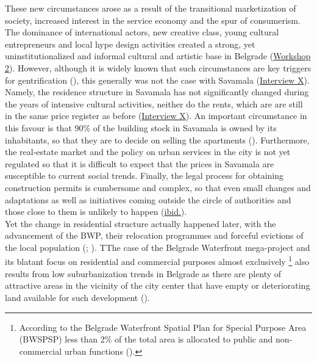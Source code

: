 \documentclass[11pt]{report}
\begin{document}
These new circumstances arose as a result of the transitional marketization of society, increased interest in the service economy and the spur of consumerism. The dominance of international actors, new creative class, young cultural entrepreneurs and local hype design activities created a strong, yet uninstitutionalized and informal cultural and artistic base in Belgrade (\href{PHD Workshop}{Workshop 2}).
However, although it is widely known that such circumstances are key triggers for gentrification  (\href{ref}{\citealt{krusche_gentrification_2015}}),
this generally was not the case with Savamala (\href{InterviewX}{Interview X}).
Namely, the residence structure in Savamala has not significantly changed during the years of intensive cultural activities, neither do the rents, which are are still in the same price register as before (\href{InterviewX}{Interview X}).
An important circumstance in this favour is that 90\% of the building stock in Savamala is owned by its inhabitants, so that they are to decide on selling the apartments (\href{ref}{\citealt{krusche_role_2015}}).
Furthermore, the real-estate market and the policy on urban services in the city is not yet regulated so that it is difficult to expect that the prices in Savamala are susceptible to current social trends.
Finally, the legal process for obtaining construction permits is cumbersome and complex, so that even small changes and adaptations as well as initiatives coming outside the circle of authorities and those close to them is unlikely to happen (\href{Klaus}{ibid.}).
\\

Yet the change in residential structure actually happened later,  with the advancement of the BWP, their relocation programmes and forceful evictions of the local population (\citealt{Princip}; \citealt{beoland}).
TThe case of the Belgrade Waterfront mega-project and its blatant focus on residential and commercial purposes almost exclusively
\footnote{According to the Belgrade Waterfront Spatial Plan for Special Purpose Area (BWSPSP) less than 2\% of the total area is allocated to public and non-commercial urban functions (\cite{BWPSPSP}).}
also results from low suburbanization trends in Belgrade as there are plenty of attractive areas in the vicinity of the city center that have empty or deteriorating land available for such development (\href{ref}{\citealt{hirt_belgrade_2009}}).
\\
\end{document}
